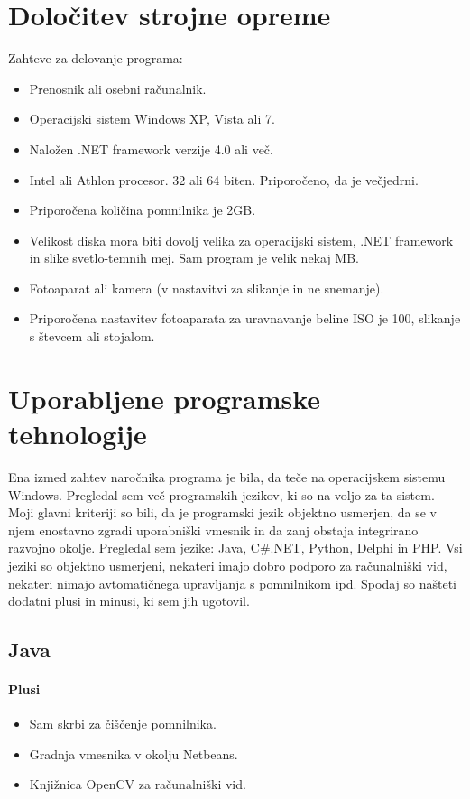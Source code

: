 \documentclass[oneside, a4paper, 12pt]{book}
\begin{document}
\section{Določitev strojne opreme}
Zahteve za delovanje programa:
\begin{itemize}
\item Prenosnik ali osebni računalnik.
\item Operacijski sistem Windows XP, Vista ali 7.
\item Naložen .NET framework verzije 4.0 ali več.
\item Intel ali Athlon procesor. 32 ali 64 biten. Priporočeno, da je 
večjedrni.
\item Priporočena količina pomnilnika je 2GB.
\item Velikost diska mora biti dovolj velika za operacijski sistem, 
.NET framework in slike svetlo-temnih mej. Sam program je velik nekaj MB. 
\item Fotoaparat ali kamera (v nastavitvi za slikanje in ne snemanje).
\item Priporočena nastavitev fotoaparata za uravnavanje beline ISO je 
100, slikanje s števcem ali stojalom.
\end{itemize}

\section{Uporabljene programske tehnologije}
Ena izmed zahtev naročnika programa je bila, da teče na operacijskem 
sistemu Windows. Pregledal sem več programskih jezikov, ki so na voljo 
za ta sistem. Moji glavni kriteriji so bili, da je programski jezik 
objektno usmerjen, da se v njem enostavno zgradi uporabniški vmesnik 
in da zanj obstaja integrirano razvojno okolje. Pregledal sem jezike: 
Java, C\#.NET, Python, Delphi in PHP. Vsi jeziki so objektno usmerjeni, 
nekateri imajo dobro podporo za računalniški vid, nekateri nimajo 
avtomatičnega upravljanja s pomnilnikom ipd. Spodaj so našteti dodatni 
plusi in minusi, ki sem jih ugotovil.

\subsection{Java}
\paragraph{Plusi}
\begin{itemize}
\item Sam skrbi za čiščenje pomnilnika.
\item Gradnja vmesnika v okolju Netbeans.
\item Knjižnica OpenCV za računalniški vid.
\end{itemize}
\end{document}
